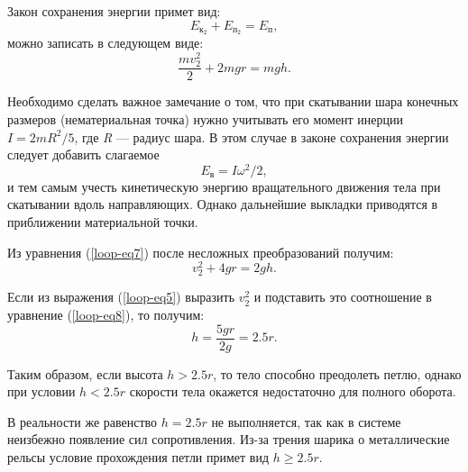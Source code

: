 \documentclass[14pt,a4paper,oneside]{extarticle}	%
\begin{document}
Закон сохранения энергии примет вид:
\begin{equation}\label{loop-eq6}
E_{\text{к}_{2}} + E_{\text{п}_{2}} = E_{\text{п}},
\end{equation}
можно записать в следующем виде:
\begin{equation}\label{loop-eq7}
\frac{mv_{2}^{2}}{2} + 2mgr = mgh.
\end{equation}

Необходимо сделать важное замечание о том, что при скатывании шара конечных размеров (нематериальная точка) нужно учитывать его момент инерции $I = 2mR^2/5$, где \textit{R} — радиус шара.
В этом случае в законе сохранения энергии следует добавить слагаемое $$E_\text{в} = I\omega^{2}/2,$$
и тем самым учесть кинетическую энергию вращательного движения тела при скатывании вдоль направляющих.
Однако дальнейшие выкладки приводятся в приближении материальной точки.

Из уравнения (\ref{loop-eq7}) после несложных преобразований получим:
\begin{equation}\label{loop-eq8}
v_{2}^{2} + 4gr = 2gh.
\end{equation}

Если из выражения (\ref{loop-eq5}) выразить $ v_{2}^{2} $ и подставить это соотношение в уравнение (\ref{loop-eq8}), то получим:
\begin{equation}\label{loop-eq9}
h = \frac{5gr}{2g} = 2.5r.
\end{equation}

Таким образом, если высота $ h > 2.5r $, то тело способно преодолеть петлю, однако при условии $ h < 2.5r $ скорости тела окажется недостаточно для полного оборота.

В реальности же равенство $ h = 2.5r $ не выполняется, так как в системе неизбежно появление сил сопротивления.
Из-за трения шарика о металлические рельсы условие прохождения петли примет вид $ h \geq 2.5r $.
\end{document}

